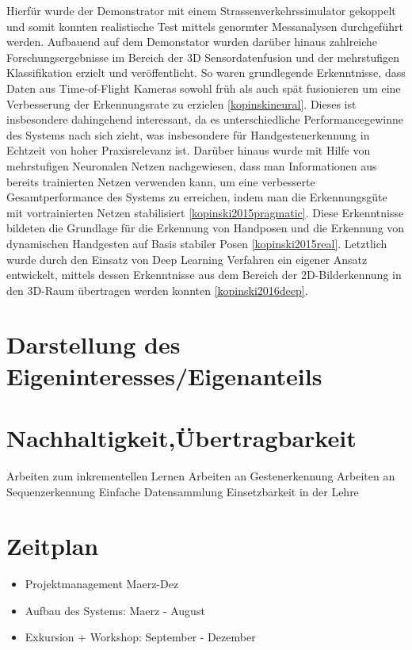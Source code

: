 \documentclass{article}
\begin{document}
Hierfür wurde der Demonstrator mit einem Strassenverkehrssimulator gekoppelt und somit konnten realistische Test mittels genormter Messanalysen durchgeführt werden. Aufbauend auf dem Demonstator wurden darüber hinaus zahlreiche Forschungsergebnisse im Bereich der 3D Sensordatenfusion und der mehrstufigen Klassifikation erzielt und veröffentlicht. So waren grundlegende Erkenntnisse, dass Daten aus Time-of-Flight Kameras sowohl früh als auch spät fusionieren um eine Verbesserung der Erkennungsrate zu erzielen \ref{kopinskineural}. Dieses ist insbesondere dahingehend interessant, da es unterschiedliche Performancegewinne des Systems nach sich zieht, was insbesondere für Handgestenerkennung in Echtzeit von hoher Praxisrelevanz ist. Darüber hinaus wurde mit Hilfe von mehrstufigen Neuronalen Netzen nachgewiesen, dass man Informationen aus bereits trainierten Netzen verwenden kann, um eine verbesserte Gesamtperformance des Systems zu erreichen, indem man die Erkennungsgüte mit vortrainierten Netzen stabilisiert \ref{kopinski2015pragmatic}. Diese Erkenntnisse bildeten die Grundlage für die Erkennung von Handposen und die Erkennung von dynamischen Handgesten auf Basis stabiler Posen \ref{kopinski2015real}. Letztlich wurde durch den Einsatz von Deep Learning Verfahren ein eigener Ansatz entwickelt, mittels dessen Erkenntnisse aus dem Bereich der 2D-Bilderkennung in den 3D-Raum übertragen werden konnten \ref{kopinski2016deep}.  

\renewcommand{\thesection}{5}
\section{Darstellung des Eigeninteresses/Eigenanteils}


\renewcommand{\thesection}{6}
\section{Nachhaltigkeit,Übertragbarkeit}
Arbeiten zum inkrementellen Lernen
Arbeiten an Gestenerkennung
Arbeiten an Sequenzerkennung
Einfache Datensammlung
Einsetzbarkeit in der Lehre

\renewcommand{\thesection}{7}
\section{Zeitplan}

\begin{itemize}
\item Projektmanagement Maerz-Dez
\item Aufbau des Systems: Maerz - August
\item Exkursion + Workshop: September - Dezember

\end{itemize}
\end{document}
